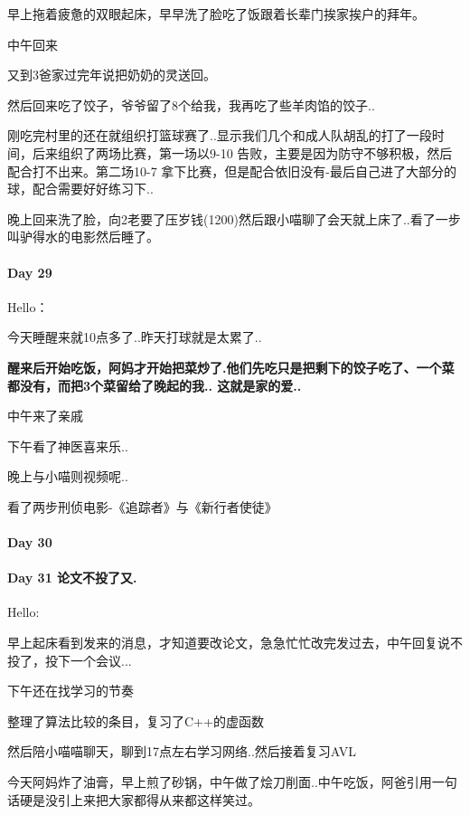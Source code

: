 \documentclass[UTF8,a4paper,8pt]{ctexart}
\begin{document}
	     早上拖着疲惫的双眼起床，早早洗了脸吃了饭跟着长辈门挨家挨户的拜年。
	     
	     中午回来
	     
	     又到3爸家过完年说把奶奶的灵送回。
	     
	     然后回来吃了饺子，爷爷留了8个给我，我再吃了些羊肉馅的饺子..
	     
	     刚吃完村里的还在就组织打篮球赛了..显示我们几个和成人队胡乱的打了一段时间，后来组织了两场比赛，第一场以9-10 告败，主要是因为防守不够积极，然后配合打不出来。第二场10-7 拿下比赛，但是配合依旧没有-最后自己进了大部分的球，配合需要好好练习下..
	     
	     晚上回来洗了脸，向2老要了压岁钱(1200)然后跟小喵聊了会天就上床了..看了一步叫驴得水的电影然后睡了。
     \paragraph{Day 29      \quad     } 
	     Hello：
	     
	     今天睡醒来就10点多了..昨天打球就是太累了..
	     
	     \textbf{醒来后开始吃饭，阿妈才开始把菜炒了.他们先吃只是把剩下的饺子吃了、一个菜都没有，而把3个菜留给了晚起的我.. 这就是家的爱..}
	     
	     中午来了亲戚
	     
	     下午看了神医喜来乐..
	     
	     晚上与小喵则视频呢..
	     
	     看了两步刑侦电影-《追踪者》与《新行者使徒》
     \paragraph{Day 30      \quad     }
     \paragraph{Day 31  论文不投了又.    \quad     }
	     Hello:
	     
	     早上起床看到发来的消息，才知道要改论文，急急忙忙改完发过去，中午回复说不投了，投下一个会议...
	     
	     下午还在找学习的节奏
	     
	     整理了算法比较的条目，复习了C++的虚函数
	     
		 然后陪小喵喵聊天，聊到17点左右学习网络..然后接着复习AVL
		 
		 今天阿妈炸了油膏，早上煎了砂锅，中午做了烩刀削面..中午吃饭，阿爸引用一句话硬是没引上来把大家都得从来都这样笑过。
		 
\end{document}
